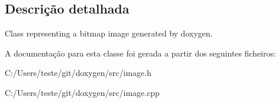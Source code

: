 \subsection{Descrição detalhada}
Class representing a bitmap image generated by doxygen. 

A documentação para esta classe foi gerada a partir dos seguintes ficheiros\-:\begin{DoxyCompactItemize}
\item 
C\-:/\-Users/teste/git/doxygen/src/image.\-h\item 
C\-:/\-Users/teste/git/doxygen/src/image.\-cpp\end{DoxyCompactItemize}
